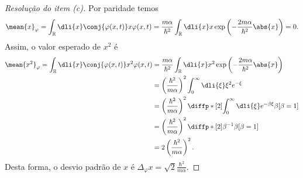 \begin{proof}[Resolução do item (c)]
    Por paridade temos
    \begin{equation*}
        \mean{x}_{\varphi} = \int_{\mathbb{R}}\dli{x} \conj{\varphi(x,t)} x \varphi(x, t) = \frac{m \alpha}{\hbar^2}\int_{\mathbb{R}} \dli{x} x \exp{\left(-\frac{2m \alpha}{\hbar^2}\abs{x}\right)} = 0.
    \end{equation*}
    Assim, o valor esperado de \(x^2\) é
    \begin{align*}
        \mean{x^2}_{\varphi} = \int_{\mathbb{R}} \dli{x} \conj{\varphi(x,t)} x^2\varphi(x,t)
        &= \frac{m \alpha}{\hbar^2} \int_{\mathbb{R}} \dli{x} x^2 \exp{\left(-\frac{2m \alpha}{\hbar^2}\abs{x}\right)}\\
        &= \left(\frac{\hbar^2}{m\alpha}\right)^2 \int_0^\infty \dli{\xi} \xi^2e^{-\xi}\\
        &= \left(\frac{\hbar^2}{m\alpha}\right)^2 \diffp*[2]{\int_0^\infty\dli{\xi} e^{-\beta\xi}}{\beta}[\beta = 1]\\
        &= \left(\frac{\hbar^2}{m\alpha}\right)^2 \diffp*[2]{\beta^{-1}}{\beta}[\beta = 1]\\
        &= 2\left(\frac{\hbar^2}{m\alpha}\right)^2.
    \end{align*}
    Desta forma, o desvio padrão de \(x\) é \(\Delta_\varphi x = \sqrt{2}\frac{\hbar^2}{m \alpha}\).
\end{proof}

